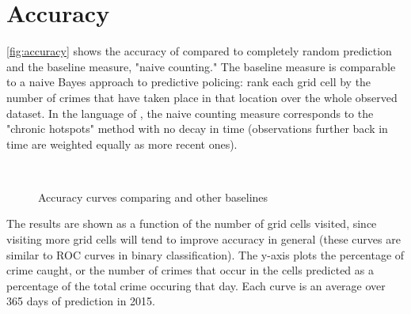 \section{Accuracy}
\autoref{fig:accuracy} shows the accuracy of \pp compared to completely random prediction and the baseline measure, "naive counting." The baseline measure is comparable to a naive Bayes approach to predictive policing: rank each grid cell by the number of crimes that have taken place in that location over the whole observed dataset. In the language of \citet{mohler_marked_2014}, the naive counting measure corresponds to the "chronic hotspots" method with no decay in time (observations further back in time are weighted equally as more recent ones).
\begin{figure}[bth]
    \myfloatalign
     \quad
     \\
    \caption[Accuracy curves comparing \pp and other baselines]{Accuracy curves comparing \pp and other baselines}\label{fig:accuracy}
\end{figure}
The results are shown as a function of the number of grid cells visited, since visiting more grid cells will tend to improve accuracy in general (these curves are similar to ROC curves in binary classification). The y-axis plots the percentage of crime caught, or the number of crimes that occur in the cells predicted as a percentage of the total crime occuring that day. Each curve is an average over 365 days of prediction in 2015.


